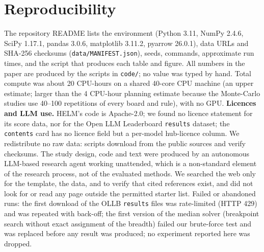 \documentclass{article}
\theoremstyle{remark}
\begin{document}
\section{Reproducibility}\label{app:repro}
The repository README lists the environment (Python 3.11, NumPy 2.4.6, SciPy 1.17.1, pandas 3.0.6, matplotlib 3.11.2, pyarrow 26.0.1), data URLs and SHA-256 checksums (\texttt{data/MANIFEST.json}), seeds, commands, approximate run times, and the script that produces each table and figure. All numbers in the paper are produced by the scripts in \texttt{code/}; no value was typed by hand. Total compute was about 20 CPU-hours on a shared 40-core CPU machine (an upper estimate; larger than the 4 CPU-hour planning estimate because the Monte-Carlo studies use 40--100 repetitions of every board and rule), with no GPU. \textbf{Licences and LLM use.} HELM's code is Apache-2.0; we found no licence statement for its score data, nor for the Open LLM Leaderboard \texttt{results} dataset; the \texttt{contents} card has no licence field but a per-model hub-licence column. We redistribute no raw data: scripts download from the public sources and verify checksums. The study design, code and text were produced by an autonomous LLM-based research agent working unattended, which is a non-standard element of the research process, not of the evaluated methods. We searched the web only for the template, the data, and to verify that cited references exist, and did not look for or read any page outside the permitted starter list. Failed or abandoned runs: the first download of the OLLB \texttt{results} files was rate-limited (HTTP 429) and was repeated with back-off; the first version of the median solver (breakpoint search without exact assignment of the breadth) failed our brute-force test and was replaced before any result was produced; no experiment reported here was dropped.

\newpage

\end{document}
